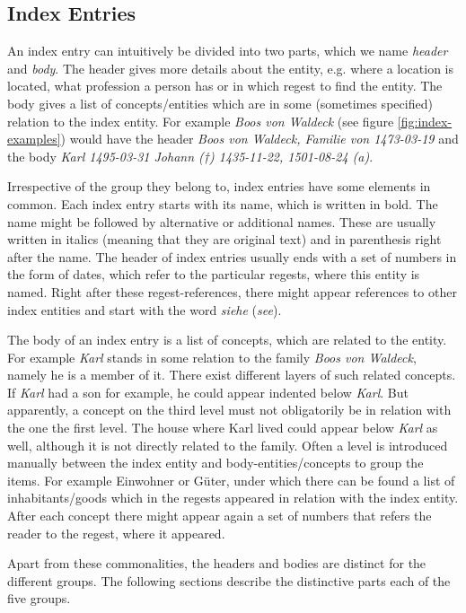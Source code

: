 \subsection{Index Entries}
An index entry can intuitively be divided into two parts, which we name \textit{header} and \textit{body}. The header gives more details about the entity, e.g. where a location is located, what profession a person has or in which regest to find the entity. The body gives a list of concepts/entities which are in some (sometimes specified) relation to the index entity. For example \textit{Boos von Waldeck} (see figure \ref{fig:index-examples}) would have the header \textit{Boos von Waldeck, Familie von 1473-03-19} and the body \textit{Karl 1495-03-31 Johann (†) 1435-11-22, 1501-08-24 (a)}.

Irrespective of the group they belong to, index entries have some elements in common. Each index entry starts with its name, which is written in bold. The name might be followed by alternative or additional names. These are usually written in italics (meaning that they are original text) and in parenthesis right after the name. The header of index entries usually ends with a set of numbers in the form of dates, which refer to the particular regests, where this entity is named. Right after these regest-references, there might appear references to other index entities and start with the word \textit{siehe} (\textit{see}).

The body of an index entry is a list of concepts, which are related to the entity. For example \textit{Karl} stands in some relation to the family \textit{Boos von Waldeck}, namely he is a member of it. There exist different layers of such related concepts. If \textit{Karl} had a son for example, he could appear indented below \textit{Karl}. But apparently, a concept on the third level must not obligatorily be in relation with the one the first level. The house where Karl lived could appear below \textit{Karl} as well, although it is not directly related to the family. Often a level is introduced manually between the index entity and body-entities/concepts to group the items. For example Einwohner or Güter, under which there can be found a list of inhabitants/goods which in the regests appeared in relation with the index entity. After each concept there might appear again a set of numbers that refers the reader to the regest, where it appeared.

Apart from these commonalities, the headers and bodies are distinct for the different groups. The following sections describe the distinctive parts each of the five groups. 

